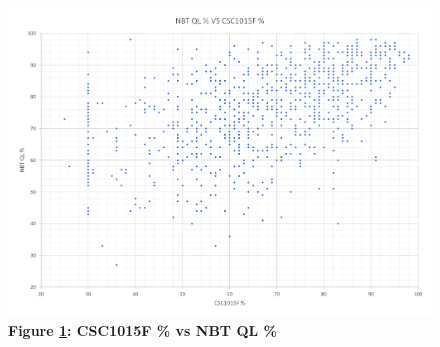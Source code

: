 \begin{figure}[H]
    \centering
    \includegraphics[scale=0.62]{./resources/figures/nbtql.png}
    \caption[CSC1015F \% vs NBT QL \%]{\textbf{Figure \ref{fig-correlation-nbtql}: CSC1015F \% vs NBT QL \%}}
    \label{fig-correlation-nbtql}
\end{figure}
